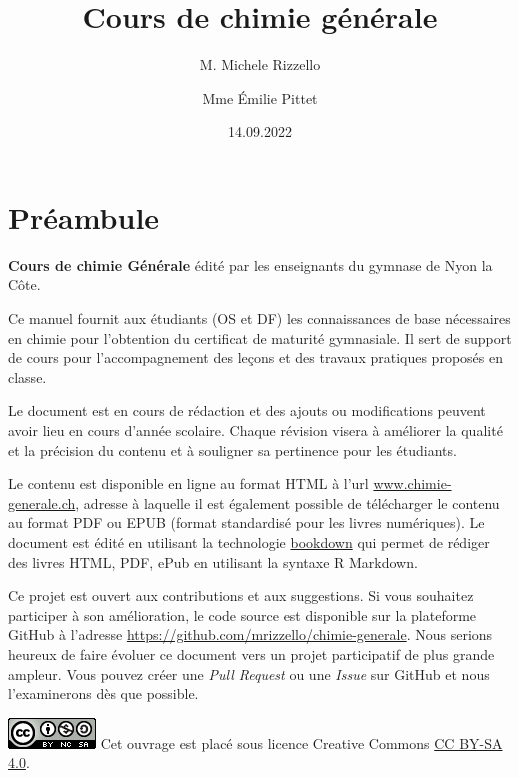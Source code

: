 \documentclass[
  11pt,
  french,
  a4paper,
  openany]{book}
\title{Cours de chimie générale}
\author{M. Michele Rizzello \and Mme Émilie Pittet}
\date{14.09.2022}
\begin{document}
\maketitle

{
\setcounter{tocdepth}{1}
\tableofcontents
}
\hypertarget{pruxe9ambule}{%
\chapter*{Préambule}\label{pruxe9ambule}}

\textbf{Cours de chimie Générale} édité par les enseignants du gymnase de Nyon la Côte.

Ce manuel fournit aux étudiants (OS et DF) les connaissances de base nécessaires en chimie pour l'obtention du certificat de maturité gymnasiale. Il sert de support de cours pour l'accompagnement des leçons et des travaux pratiques proposés en classe.

Le document est en cours de rédaction et des ajouts ou modifications peuvent avoir lieu en cours d'année scolaire. Chaque révision visera à améliorer la qualité et la précision du contenu et à souligner sa pertinence pour les étudiants.

Le contenu est disponible en ligne au format HTML à l'url \url{www.chimie-generale.ch}, adresse à laquelle il est également possible de télécharger le contenu au format PDF ou EPUB (format standardisé pour les livres numériques). Le document est édité en utilisant la technologie \href{https://bookdown.org/}{bookdown} qui permet de rédiger des livres HTML, PDF, ePub en utilisant la syntaxe R Markdown.

Ce projet est ouvert aux contributions et aux suggestions. Si vous souhaitez participer à son amélioration, le code source est disponible sur la plateforme GitHub à l'adresse \url{https://github.com/mrizzello/chimie-generale}. Nous serions heureux de faire évoluer ce document vers un projet participatif de plus grande ampleur. Vous pouvez créer une \emph{Pull Request} ou une \emph{Issue} sur GitHub et nous l'examinerons dès que possible.


\includegraphics{images/by-nc-sa.png}
Cet ouvrage est placé sous licence Creative Commons \href{https://creativecommons.org/licenses/by-sa/4.0/deed.fr}{CC BY-SA 4.0}.
\end{document}
